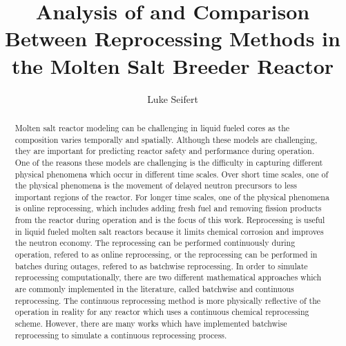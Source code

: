 \documentclass[edeposit,fullpage,hidelinks]{uiucthesis2018}
\title{Analysis of and Comparison Between Reprocessing Methods in the Molten Salt Breeder Reactor}
\author{Luke Seifert}
\begin{document}
\maketitle

\frontmatter
\begin{abstract}

Molten salt reactor modeling can be challenging in liquid fueled cores as the composition varies temporally and spatially.
Although these models are challenging, they are important for predicting reactor safety and performance during operation.
One of the reasons these models are challenging is the difficulty in capturing different physical phenomena which occur in different time scales.
Over short time scales, one of the physical phenomena is the movement of delayed neutron precursors to less important regions of the reactor.
For longer time scales, one of the physical phenomena is online reprocessing, which includes adding fresh fuel and removing fission products from the reactor during operation and is the focus of this work.
Reprocessing is useful in liquid fueled molten salt reactors because it limits chemical corrosion and improves the neutron economy.
The reprocessing can be performed continuously during operation, refered to as online reprocessing, or the reprocessing can be performed in batches during outages, refered to as batchwise reprocessing.
In order to simulate reprocessing computationally, there are two different mathematical approaches which are commonly implemented in the literature, called batchwise and continuous reprocessing.
The continuous reprocessing method is more physically reflective of the operation in reality for any reactor which uses a continuous chemical reprocessing scheme.
However, there are many works which have implemented batchwise reprocessing to simulate a continuous reprocessing process.

\end{abstract}
\end{document}
